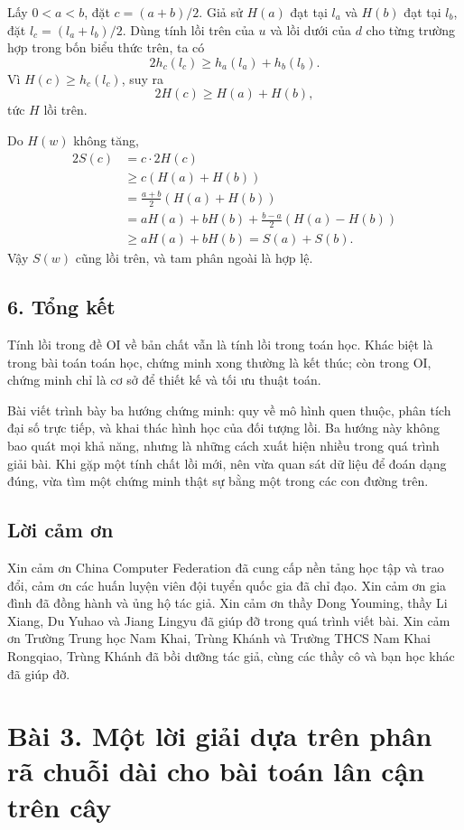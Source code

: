 \documentclass[11pt]{article}
\begin{document}
Lấy $0<a<b$, đặt $c=(a+b)/2$. Giả sử $H(a)$ đạt tại $l_a$ và $H(b)$ đạt tại
$l_b$, đặt $l_c=(l_a+l_b)/2$. Dùng tính lồi trên của $u$ và lồi dưới của $d$
cho từng trường hợp trong bốn biểu thức trên, ta có
\[
  2h_c(l_c)\ge h_a(l_a)+h_b(l_b).
\]
Vì $H(c)\ge h_c(l_c)$, suy ra
\[
  2H(c)\ge H(a)+H(b),
\]
tức $H$ lồi trên.

Do $H(w)$ không tăng,
\[
\begin{aligned}
  2S(c)&=c\cdot 2H(c)\\
       &\ge c(H(a)+H(b))\\
       &=\frac{a+b}{2}(H(a)+H(b))\\
       &=aH(a)+bH(b)+\frac{b-a}{2}(H(a)-H(b))\\
       &\ge aH(a)+bH(b)=S(a)+S(b).
\end{aligned}
\]
Vậy $S(w)$ cũng lồi trên, và tam phân ngoài là hợp lệ.

\subsection*{6. Tổng kết}

Tính lồi trong đề OI về bản chất vẫn là tính lồi trong toán học. Khác biệt là
trong bài toán toán học, chứng minh xong thường là kết thúc; còn trong OI,
chứng minh chỉ là cơ sở để thiết kế và tối ưu thuật toán.

Bài viết trình bày ba hướng chứng minh: quy về mô hình quen thuộc, phân tích
đại số trực tiếp, và khai thác hình học của đối tượng lồi. Ba hướng này không
bao quát mọi khả năng, nhưng là những cách xuất hiện nhiều trong quá trình
giải bài. Khi gặp một tính chất lồi mới, nên vừa quan sát dữ liệu để đoán dạng
đúng, vừa tìm một chứng minh thật sự bằng một trong các con đường trên.

\subsection*{Lời cảm ơn}

Xin cảm ơn China Computer Federation đã cung cấp nền tảng học tập và trao đổi,
cảm ơn các huấn luyện viên đội tuyển quốc gia đã chỉ đạo. Xin cảm ơn gia đình
đã đồng hành và ủng hộ tác giả. Xin cảm ơn thầy Dong Youming, thầy Li Xiang,
Du Yuhao và Jiang Lingyu đã giúp đỡ trong quá trình viết bài. Xin cảm ơn
Trường Trung học Nam Khai, Trùng Khánh và Trường THCS Nam Khai Rongqiao,
Trùng Khánh đã bồi dưỡng tác giả, cùng các thầy cô và bạn học khác đã giúp
đỡ.

\section*{Bài 3. Một lời giải dựa trên phân rã chuỗi dài cho bài toán lân cận trên cây}
\end{document}

